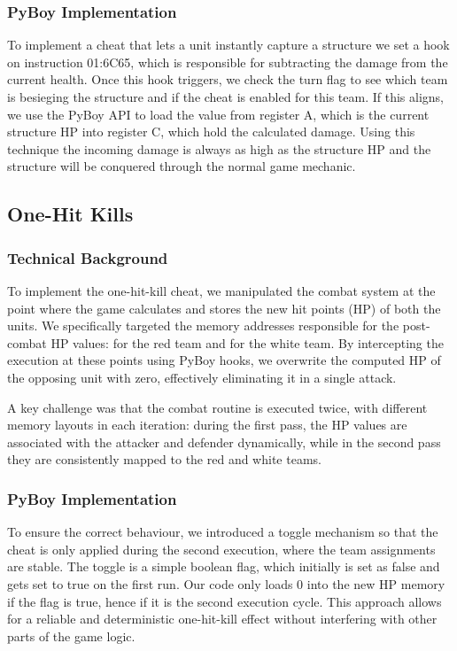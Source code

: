 \subsubsection{PyBoy Implementation}
To implement a cheat that lets a unit instantly capture a structure we set a hook on instruction 01:6C65, which is responsible for subtracting the damage from the current health.
Once this hook triggers, we check the turn flag to see which team is besieging the structure and if the cheat is enabled for this team.
If this aligns, we use the PyBoy API to load the value from register A, which is the current structure HP into register C, which hold the calculated damage.
Using this technique the incoming damage is always as high as the structure HP and the structure will be conquered through the normal game mechanic.

\subsection{One-Hit Kills}
\subsubsection{Technical Background}
To implement the one-hit-kill cheat, we manipulated the combat system at the point where the game calculates and stores the new hit points (HP) of both the units. We specifically targeted the memory addresses responsible for the post-combat HP values:  for the red team and  for the white team. By intercepting the execution at these points using PyBoy hooks, we overwrite the computed HP of the opposing unit with zero, effectively eliminating it in a single attack.

A key challenge was that the combat routine is executed twice, with different memory layouts in each iteration: during the first pass, the HP values are associated with the attacker and defender dynamically, while in the second pass they are consistently mapped to the red and white teams. 

\subsubsection{PyBoy Implementation}
To ensure the correct behaviour, we introduced a toggle mechanism so that the cheat is only applied during the second execution, where the team assignments are stable. The toggle is a simple boolean flag, which initially is set as false and gets set to true on the first run. Our code only loads 0 into the new HP memory if the flag is true, hence if it is the second execution cycle. This approach allows for a reliable and deterministic one-hit-kill effect without interfering with other parts of the game logic.
